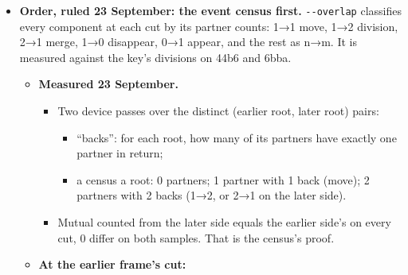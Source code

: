 \begin{itemize}
\begin{itemize}
\item Theirs: \texttt{core/\allowbreak{}links.\allowbreak{}py}.

\begin{itemize}
\item Positions: \texttt{find\_\allowbreak{}futures}, \texttt{find\_\allowbreak{}pasts}, \texttt{find\_\allowbreak{}single\_\allowbreak{}future}, \texttt{find\_\allowbreak{}single\_\allowbreak{}past}.
\item Appear and disappear: \texttt{find\_\allowbreak{}appeared\_\allowbreak{}positions}, \texttt{find\_\allowbreak{}disappeared\_\allowbreak{}positions}.
\item Tracks: \texttt{get\_\allowbreak{}track}, \texttt{find\_\allowbreak{}all\_\allowbreak{}descending\_\allowbreak{}tracks}, \texttt{find\_\allowbreak{}all\_\allowbreak{}tracks\_\allowbreak{}in\_\allowbreak{}same\_\allowbreak{}lineage}, \texttt{find\_\allowbreak{}starting\_\allowbreak{}tracks}, \texttt{find\_\allowbreak{}ending\_\allowbreak{}tracks}, \texttt{find\_\allowbreak{}all\_\allowbreak{}tracks\_\allowbreak{}in\_\allowbreak{}time\_\allowbreak{}point}.
\item Data attached to links and lineages: \texttt{get\_\allowbreak{}link\_\allowbreak{}data}, \texttt{find\_\allowbreak{}all\_\allowbreak{}links\_\allowbreak{}with\_\allowbreak{}data}, \texttt{get\_\allowbreak{}lineage\_\allowbreak{}data}.
\end{itemize}
\item Ours to build: the same queries over our track graph, in one module behind one request struct, with the exact fields as link data.
\end{itemize}
\item \textbf{Order, ruled 23 September: the event census first.} \texttt{-\allowbreak{}-\allowbreak{}overlap} classifies every component at each cut by its partner counts: 1→1 move, 1→2 division, 2→1 merge, 1→0 disappear, 0→1 appear, and the rest as n→m. It is measured against the key's divisions on 44b6 and 6bba.

\begin{itemize}
\item \textbf{Measured 23 September.}

\begin{itemize}
\item Two device passes over the distinct (earlier root, later root) pairs:

\begin{itemize}
\item “backs”: for each root, how many of its partners have exactly one partner in return;
\item a census a root: 0 partners; 1 partner with 1 back (move); 2 partners with 2 backs (1→2, or 2→1 on the later side).
\end{itemize}
\item Mutual counted from the later side equals the earlier side's on every cut, 0 differ on both samples. That is the census's proof.
\end{itemize}
\item \textbf{At the earlier frame's cut:}


\end{itemize}
\end{itemize}
